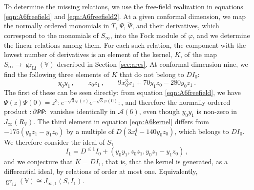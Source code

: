 \documentclass[12pt]{article}
\numberwithin{equation}{section}
\numberwithin{figure}{section}
\theoremstyle{plain}
\theoremstyle{definition}
\begin{document}
To determine the missing relations, we use the free-field realization in equations \eqref{eqn:A6freefield} and \eqref{eqn:A6freefield2}. At a given conformal dimension, we map the normally ordered monomials in $T$, $\Psi$, $\widetilde{\Psi}$, and their derivatives, which correspond to the monomials of $S_\infty$, into the Fock module of $\varphi$, and we determine the linear relations among them. For each such relation, the component with the lowest number of derivatives is an element of the kernel, $K$, of the map $S_\infty \rightarrow \operatorname{gr}_{\operatorname{Li}}(\mathbb{V})$ described in Section \ref{sec:arcs}. At conformal dimension nine, we find the following three elements of $K$ that do not belong to $DI_0$:
\begin{equation}\label{eqn:A6kernel}
    y_0 y_1 \,, \qquad z_0 z_1 \,, \qquad 9x_0^3x_1 + 70y_1z_0 - 280y_0z_1 \,.
\end{equation}
The first of these can be seen directly: from equation \eqref{eqn:A6freefield}, we have $\Psi(z) \Psi(0) = z^3 :\! e^{-\sqrt{3}\varphi(z)} e^{-\sqrt{3}\varphi(0)} \!:$, and therefore the normally ordered product $:\!\partial\Psi \Psi\!:$ vanishes identically in $\mathcal{A}(6)$, even though $y_0 y_1$ is non-zero in $J_\infty(R_\mathbb{V})$. The third element in equation \eqref{eqn:A6kernel} differs from $-175(y_0z_1 - y_1z_0)$ by a multiple of $D(3x_0^4 - 140y_0z_0)$, which belongs to $DI_0$. We therefore consider the ideal of $S_1$
\begin{equation}\label{eqn:A6I1}
  I_1 = D^{\leq 1} I_0 + (y_0y_1, z_0z_1, y_0z_1 - y_1z_0) \,,
\end{equation}
and we conjecture that $K = DI_1$, that is, that the kernel is generated, as a differential ideal, by relations of order at most one. Equivalently, $\operatorname{gr}_{\operatorname{Li}}(\mathbb{V}) \cong J_{\infty,1}(S, I_1)$.
\end{document}
